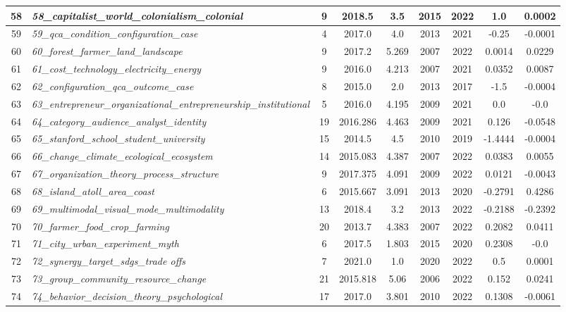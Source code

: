 \documentclass[12pt]{article}
\begin{document}
\begin{landscape}
\begin{scriptsize}
\begin{longtable}{|>{\scriptsize}c|p{6cm}|c|c|c|c|c|c|c|}
58 & \textit{58\_capitalist\_world\_colonialism\_colonial} & 9 & 2018.5 & 3.5 & 2015 & 2022 & 1.0 & 0.0002 \\ \hline
59 & \textit{59\_qca\_condition\_configuration\_case} & 4 & 2017.0 & 4.0 & 2013 & 2021 & -0.25 & -0.0001 \\ \hline
60 & \textit{60\_forest\_farmer\_land\_landscape} & 9 & 2017.2 & 5.269 & 2007 & 2022 & 0.0014 & 0.0229 \\ \hline
61 & \textit{61\_cost\_technology\_electricity\_energy} & 9 & 2016.0 & 4.213 & 2007 & 2021 & 0.0352 & 0.0087 \\ \hline
62 & \textit{62\_configuration\_qca\_outcome\_case} & 8 & 2015.0 & 2.0 & 2013 & 2017 & -1.5 & -0.0004 \\ \hline
63 & \textit{63\_entrepreneur\_organizational\_entrepreneurship\_institutional} & 5 & 2016.0 & 4.195 & 2009 & 2021 & 0.0 & -0.0 \\ \hline
64 & \textit{64\_category\_audience\_analyst\_identity} & 19 & 2016.286 & 4.463 & 2009 & 2021 & 0.126 & -0.0548 \\ \hline
65 & \textit{65\_stanford\_school\_student\_university} & 15 & 2014.5 & 4.5 & 2010 & 2019 & -1.4444 & -0.0004 \\ \hline
66 & \textit{66\_change\_climate\_ecological\_ecosystem} & 14 & 2015.083 & 4.387 & 2007 & 2022 & 0.0383 & 0.0055 \\ \hline
67 & \textit{67\_organization\_theory\_process\_structure} & 9 & 2017.375 & 4.091 & 2009 & 2022 & 0.0121 & -0.0043 \\ \hline
68 & \textit{68\_island\_atoll\_area\_coast} & 6 & 2015.667 & 3.091 & 2013 & 2020 & -0.2791 & 0.4286 \\ \hline
69 & \textit{69\_multimodal\_visual\_mode\_multimodality} & 13 & 2018.4 & 3.2 & 2013 & 2022 & -0.2188 & -0.2392 \\ \hline
70 & \textit{70\_farmer\_food\_crop\_farming} & 20 & 2013.7 & 4.383 & 2007 & 2022 & 0.2082 & 0.0411 \\ \hline
71 & \textit{71\_city\_urban\_experiment\_myth} & 6 & 2017.5 & 1.803 & 2015 & 2020 & 0.2308 & -0.0 \\ \hline
72 & \textit{72\_synergy\_target\_sdgs\_trade offs} & 7 & 2021.0 & 1.0 & 2020 & 2022 & 0.5 & 0.0001 \\ \hline
73 & \textit{73\_group\_community\_resource\_change} & 21 & 2015.818 & 5.06 & 2006 & 2022 & 0.152 & 0.0241 \\ \hline
74 & \textit{74\_behavior\_decision\_theory\_psychological} & 17 & 2017.0 & 3.801 & 2010 & 2022 & 0.1308 & -0.0061 \\ \hline

\end{longtable}
\end{scriptsize}
\end{landscape}
\end{document}
